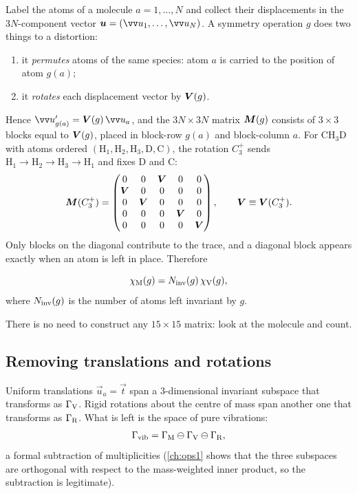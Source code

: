 Label the atoms of a molecule $a=1,\dots,N$ and collect their displacements in the
$3N$-component vector $\mat{u}=(\vec{u}_1,\dots,\vec{u}_N)$. A symmetry operation $g$
does two things to a distortion:
\begin{enumerate}
\item it \emph{permutes} atoms of the same species: atom $a$ is carried to the position
      of atom $g(a)$;
\item it \emph{rotates} each displacement vector by $\bm{V}(g)$.
\end{enumerate}
Hence $\vec{u}'_{g(a)}=\mat{V}(g)\,\vec{u}_a$, and the $3N\times3N$ matrix $\bm{M}(g)$
consists of $3\times3$ blocks equal to $\bm{V}(g)$, placed in block-row $g(a)$ and
block-column $a$. For $\mathrm{CH_3D}$ with atoms ordered
$(\mathrm{H}_1,\mathrm{H}_2,\mathrm{H}_3,\mathrm{D},\mathrm{C})$, the rotation $C_3^+$
sends $\mathrm{H}_1\to\mathrm{H}_2\to\mathrm{H}_3\to\mathrm{H}_1$ and fixes D and C:
\[
\bm{M}(C_3^+)=\begin{pmatrix}
0&0&\bm{V}&0&0\\
\bm{V}&0&0&0&0\\
0&\bm{V}&0&0&0\\
0&0&0&\bm{V}&0\\
0&0&0&0&\bm{V}
\end{pmatrix},\qquad \bm{V}\equiv\bm{V}(C_3^+).
\]
Only blocks on the diagonal contribute to the trace, and a diagonal block appears
exactly when an atom is left in place. Therefore
\begin{keyresult}
\begin{equation}\label{eq:chiM}
  \chi_{\mathrm{M}}(g)=N_{\mathrm{inv}}(g)\,\chi_{\mathrm{V}}(g),
\end{equation}
where $N_{\mathrm{inv}}(g)$ is the number of atoms left invariant by $g$.
\end{keyresult}
There is no need to construct any $15\times15$ matrix: look at the molecule and count.

\subsection{Removing translations and rotations}
Uniform translations $\vec{u}_a=\vec{t}$ span a 3-dimensional invariant subspace that
transforms as $\Gamma_{\mathrm{V}}$. Rigid rotations about the centre of mass span another one that
transforms as $\Gamma_{\mathrm{R}}$. What is left is the space of pure vibrations:
\begin{equation}
  \Gamma_{\mathrm{vib}}=\Gamma_{\mathrm{M}}\ominus\Gamma_{\mathrm{V}}\ominus\Gamma_{\mathrm{R}},
\end{equation}
a formal subtraction of multiplicities (\cref{ch:ops1} shows that the three
subspaces are orthogonal with respect to the mass-weighted inner product, so the
subtraction is legitimate).

